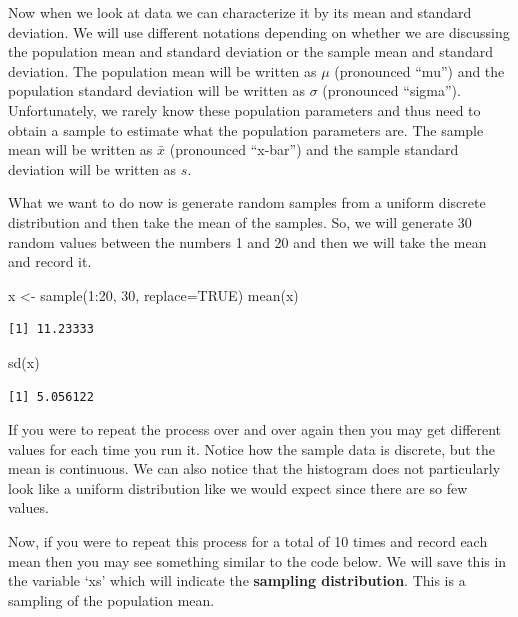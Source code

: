 \documentclass[
  letterpaper,
  DIV=11,
  numbers=noendperiod]{scrreprt}
\newenvironment{Shaded}{\begin{snugshade}}{\end{snugshade}}
\newcommand{\AttributeTok}[1]{\textcolor[rgb]{0.40,0.45,0.13}{#1}}
\newcommand{\ConstantTok}[1]{\textcolor[rgb]{0.56,0.35,0.01}{#1}}
\newcommand{\DecValTok}[1]{\textcolor[rgb]{0.68,0.00,0.00}{#1}}
\newcommand{\FunctionTok}[1]{\textcolor[rgb]{0.28,0.35,0.67}{#1}}
\newcommand{\NormalTok}[1]{\textcolor[rgb]{0.00,0.23,0.31}{#1}}
\newcommand{\OtherTok}[1]{\textcolor[rgb]{0.00,0.23,0.31}{#1}}
\newcommand{\SpecialCharTok}[1]{\textcolor[rgb]{0.37,0.37,0.37}{#1}}
\begin{document}
Now when we look at data we can characterize it by its mean and standard
deviation. We will use different notations depending on whether we are
discussing the population mean and standard deviation or the sample mean
and standard deviation. The population mean will be written as \(\mu\)
(pronounced ``mu'') and the population standard deviation will be
written as \(\sigma\) (pronounced ``sigma''). Unfortunately, we rarely
know these population parameters and thus need to obtain a sample to
estimate what the population parameters are. The sample mean will be
written as \(\bar{x}\) (pronounced ``x-bar'') and the sample standard
deviation will be written as \(s\).

What we want to do now is generate random samples from a uniform
discrete distribution and then take the mean of the samples. So, we will
generate 30 random values between the numbers 1 and 20 and then we will
take the mean and record it.

\begin{Shaded}
\begin{Highlighting}[]
\NormalTok{x }\OtherTok{\textless{}{-}} \FunctionTok{sample}\NormalTok{(}\DecValTok{1}\SpecialCharTok{:}\DecValTok{20}\NormalTok{, }\DecValTok{30}\NormalTok{, }\AttributeTok{replace=}\ConstantTok{TRUE}\NormalTok{)}
\FunctionTok{mean}\NormalTok{(x)}
\end{Highlighting}
\end{Shaded}

\begin{verbatim}
[1] 11.23333
\end{verbatim}

\begin{Shaded}
\begin{Highlighting}[]
\FunctionTok{sd}\NormalTok{(x)}
\end{Highlighting}
\end{Shaded}

\begin{verbatim}
[1] 5.056122
\end{verbatim}

If you were to repeat the process over and over again then you may get
different values for each time you run it. Notice how the sample data is
discrete, but the mean is continuous. We can also notice that the
histogram does not particularly look like a uniform distribution like we
would expect since there are so few values.

Now, if you were to repeat this process for a total of 10 times and
record each mean then you may see something similar to the code below.
We will save this in the variable `xs' which will indicate the
\textbf{sampling distribution}. This is a sampling of the population
mean.
\end{document}
